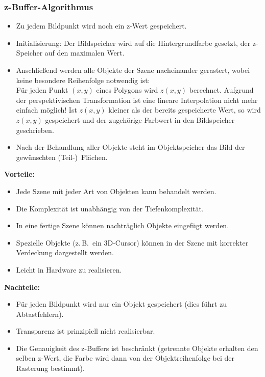 \documentclass[a4paper, 11pt, accentcolor = tud3b]{tudreport}
\newcommand{\zB}{z.\,B.~}
\begin{document}
				\subsubsection{z-Buffer-Algorithmus}
					\begin{itemize}
						\item Zu jedem Bildpunkt wird noch ein z-Wert gespeichert.
						\item Initialisierung: Der Bildspeicher wird auf die Hintergrundfarbe gesetzt, der z-Speicher auf den maximalen Wert.
						\item Anschließend werden alle Objekte der Szene nacheinander gerastert, wobei keine besondere Reihenfolge notwendig ist: \\
								Für jeden Punkt \( (x, y) \) eines Polygons wird \( z(x, y) \) berechnet. Aufgrund der perspektivischen Transformation ist eine lineare Interpolation nicht mehr einfach möglich! Ist \( z(x, y) \) kleiner als der bereits gespeicherte Wert, so wird \( z(x, y) \) gespeichert und der zugehörige Farbwert in den Bildspeicher geschrieben.
						\item Nach der Behandlung aller Objekte steht im Objektspeicher das Bild der gewünschten (Teil-)~Flächen.
					\end{itemize}
				
					\textbf{Vorteile:}
					\begin{itemize}
						\item Jede Szene mit jeder Art von Objekten kann behandelt werden.
						\item Die Komplexität ist unabhängig von der Tiefenkomplexität.
						\item In eine fertige Szene können nachträglich Objekte eingefügt werden.
						\item Spezielle Objekte (\zB ein 3D-Cursor) können in der Szene mit korrekter Verdeckung dargestellt werden.
						\item Leicht in Hardware zu realisieren.
					\end{itemize}
					\textbf{Nachteile:}
					\begin{itemize}
						\item Für jeden Bildpunkt wird nur ein Objekt gespeichert (dies führt zu Abtastfehlern).
						\item Transparenz ist prinzipiell nicht realisierbar.
						\item Die Genauigkeit des z-Buffers ist beschränkt (getrennte Objekte erhalten den selben z-Wert, die Farbe wird dann von der Objektreihenfolge bei der Rasterung bestimmt).
					\end{itemize}
\end{document}
